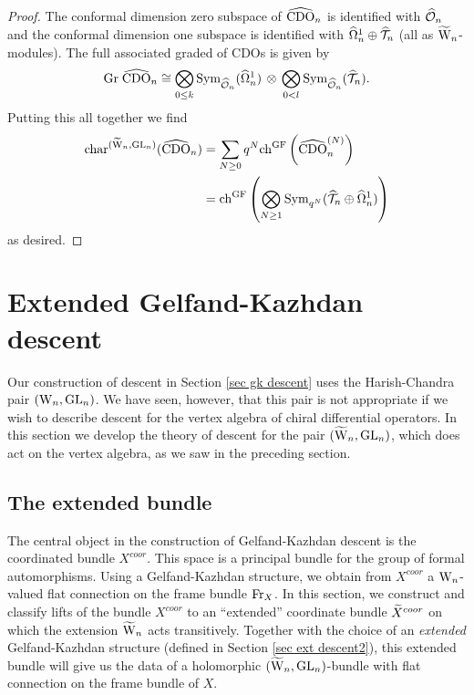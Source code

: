 \begin{proof}
The conformal dimension zero subspace of $\hCDO_n$ is identified with $\hO_n$ and the conformal dimension one subspace is identified with $\hOmega^1_n \oplus \hT_n$ (all as $\TVect$-modules). The full associated graded of CDOs is given by
\[
\Gr \; \hCDO_n \cong
\underset{{0\leq k}}{\bigotimes} \,\Sym_{\hO_n}(\hOmega^1_n)\,
\otimes \, \underset{{0<
    l}}{\bigotimes} \,\Sym_{\hO_n}(\hT_n) .
\]
Putting this all together we find
\begin{align*}
{\rm char}^{(\TVect, \GL_n)} (\hCDO_n) & = \sum_{N \geq 0} q^N {\rm
                                         ch}^{\GF}\left(\hCDO_n^{(N)}\right)
  \\ & = \ch^{\rm GF} \left(\bigotimes_{N \geq 1} \Sym_{q^N} (\hT_n \oplus
       \hOmega^1_n) \right) 
\end{align*}
as desired.
\end{proof}


\section{Extended Gelfand-Kazhdan descent} \label{sec ext desc}

Our construction of descent in Section \ref{sec gk descent} uses the Harish-Chandra pair $(\Vect, \GL_n)$. 
We have seen, however, that this pair is not appropriate 
if we wish to describe descent for the vertex algebra of chiral differential operators. 
In this section we develop the theory of descent for the pair $(\TVect, \GL_n)$, 
which does act on the vertex algebra, as we saw in the preceding section. 

\subsection{The extended bundle}
The central object in the construction of Gelfand-Kazhdan descent is the coordinated bundle $X^{coor}$. 
This space is a principal bundle for the group of formal automorphisms. 
Using a Gelfand-Kazhdan structure, we obtain from $X^{coor}$ a $\Vect$-valued flat connection on the frame bundle $\Fr_X$. 
In this section, we construct and classify lifts of the bundle $X^{coor}$ 
to an ``extended'' coordinate bundle $\Tilde{X}^{coor}$ on which the extension $\TVect$ acts transitively. 
Together with the choice of an {\em extended} Gelfand-Kazhdan structure (defined in Section \ref{sec ext descent2}), 
this extended bundle will give us the data of a holomorphic $(\TVect, \GL_n)$-bundle with flat connection on the frame bundle of $X$.

